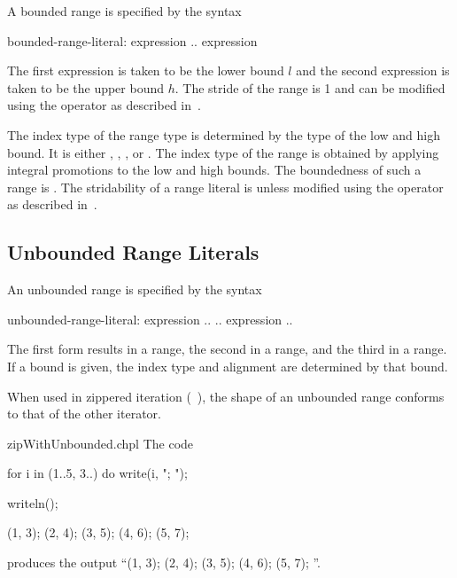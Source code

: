 A bounded range is specified by the syntax
\begin{syntax}
bounded-range-literal:
  expression .. expression
\end{syntax}
The first expression is taken to be the lower bound $l$ and the second
expression is taken to be the upper bound $h$.  The stride of the
range is 1 and can be modified using the  operator as described
in~.  

The index type of the range type is determined by the type of the
low and high bound.  It is either , ,
, or .  The index type of the range is obtained by
applying integral promotions to the low and high bounds.  The boundedness
of such a range is .  The stridability of a range literal
is  unless modified using the  operator as described 
in~.

\subsection{Unbounded Range Literals}
\label{Unbounded_Ranges}

An unbounded range is specified by the syntax
\begin{syntax}
unbounded-range-literal:
  expression ..
  .. expression
  ..
\end{syntax}

The first form results in a  range, the
second in a  range, and the third in
a  range.  If a bound is given, the index type and alignment are determined
by that bound.

When used in zippered iteration (~), the shape of an
unbounded range conforms to that of the other iterator.

\begin{chapelexample}{zipWithUnbounded.chpl}
The code
\begin{chapel}
for i in (1..5, 3..) do
  write(i, "; ");
\end{chapel}
\begin{chapelpost}
writeln();
\end{chapelpost}
\begin{chapeloutput}
(1, 3); (2, 4); (3, 5); (4, 6); (5, 7); 
\end{chapeloutput}
produces the output ``(1, 3); (2, 4); (3, 5); (4, 6); (5, 7); ''.
\end{chapelexample}

